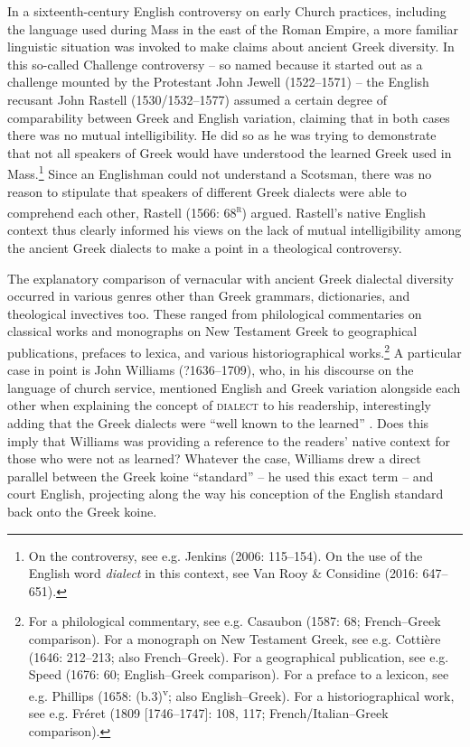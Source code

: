 In a sixteenth-century English controversy on early Church practices, including the language used during Mass in the east of the Roman Empire, a more familiar linguistic situation was invoked to make claims about ancient Greek diversity. In this so-called Challenge controversy – so named because it started out as a challenge mounted by the Protestant John Jewell (1522–1571) – the English recusant John Rastell (1530/1532–1577) assumed a certain degree of comparability between Greek and English variation, claiming that in both cases there was no mutual intelligibility. He did so as he was trying to demonstrate that not all speakers of Greek would have understood the learned Greek used in Mass.\footnote{On the controversy, see e.g. Jenkins (2006: 115–154). On the use of the English word \textit{dialect} in this context, see Van Rooy \& Considine (2016: 647–651).} Since an Englishman could not understand a Scotsman, there was no reason to stipulate that speakers of different Greek dialects were able to comprehend each other, Rastell (1566: 68\textsc{\textsuperscript{r}}) argued. Rastell’s native English context thus clearly informed his views on the lack of mutual intelligibility among the ancient Greek dialects to make a point in a theological controversy.

The explanatory comparison of vernacular with ancient Greek dialectal diversity occurred in various genres other than Greek grammars, dictionaries, and theological invectives too. These ranged from philological commentaries on classical works and monographs on New Testament Greek to geographical publications, prefaces to lexica, and various historiographical works.\footnote{For a philological commentary, see e.g. Casaubon (1587: 68; French–Greek comparison). For a monograph on New Testament Greek, see e.g. Cottière (1646: 212–213; also French–Greek). For a geographical publication, see e.g. Speed (1676: 60; English–Greek comparison). For a preface to a lexicon, see e.g. Phillips (1658: (b.3)\textsuperscript{v}\textsc{;} also English–Greek). For a historiographical work, see e.g. Fréret (1809 [1746–1747]: 108, 117; French/Italian–Greek comparison).} A particular case in point is John Williams (?1636–1709), who, in his discourse on the language of church service, mentioned English and Greek variation alongside each other when explaining the concept of \textsc{dialect} to his readership, interestingly adding that the Greek dialects were “well known to the learned” \citep[5]{Williams1685}. Does this imply that Williams was providing a reference to the readers’ native context for those who were not as learned? Whatever the case, Williams drew a direct parallel between the Greek koine “standard” – he used this exact term – and court English, projecting along the way his conception of the English standard back onto the Greek koine.


